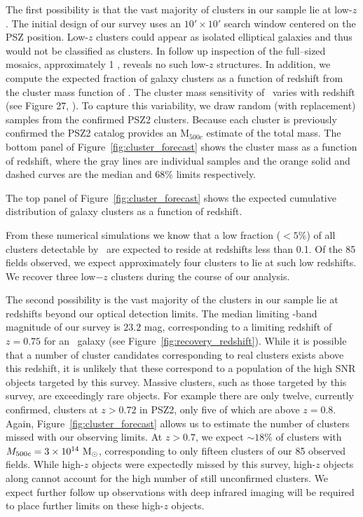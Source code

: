 \documentclass[apj, revtex4-1]{emulateapj}
\begin{document}
The first possibility is that the vast majority of clusters in our sample lie at low-$z$. The initial design of our survey uses an $10'\times10'$ search window centered on the PSZ position. Low-$z$ clusters could appear as isolated elliptical galaxies and thus would not be classified as clusters. In follow up inspection of the full--sized mosaics, approximately 1 \degsq, reveals no such low-$z$ structures. In addition, we compute the expected fraction of galaxy clusters as a function of redshift from the cluster mass function of \cite{Tinker2008}. The cluster mass sensitivity of \planck\ varies with redshift (see Figure 27, \citealt{PlanckCollaboration2015a}). To capture this variability, we draw random (with replacement) samples from the confirmed PSZ2 clusters. Because each cluster is previously confirmed the PSZ2 catalog provides an M$_{500c}$ estimate of the total mass. The bottom panel of Figure~\ref{fig:cluster_forecast} shows the cluster mass as a function of redshift, where the gray lines are individual samples and the orange solid and dashed curves are the median and 68\% limits respectively.

The top panel of Figure~\ref{fig:cluster_forecast} shows the expected cumulative distribution of galaxy clusters as a function of redshift.

From these numerical simulations we know that a low fraction ($<5\%$) of all clusters detectable by \planck\ are expected to reside at redshifts less than 0.1. Of the 85 fields observed, we expect approximately four clusters to lie at such low redshifts. We recover three low$-z$ clusters during the course of our analysis.

The second possibility is the vast majority of the clusters in our sample lie at redshifts beyond our optical detection limits. The median limiting \sdssi-band magnitude of our survey is $23.2$ mag, corresponding to a limiting redshift of $z=0.75$ for an \mstar\ galaxy (see Figure~\ref{fig:recovery_redshift}). While it is possible that a number of cluster candidates corresponding to real clusters exists above this redshift, it is unlikely that these correspond to a population of the high SNR objects targeted by this survey. Massive clusters, such as those targeted by this survey, are exceedingly rare objects. For example there are only twelve, currently confirmed, clusters at $z>0.72$ in PSZ2, only five of which are above $z=0.8$. Again, Figure~\ref{fig:cluster_forecast} allows us to estimate the number of clusters missed with our observing limits. At $z>0.7$, we expect $\sim18\%$ of clusters with $M_{500c}=3\times10^{14}~\hbox{$\mathrm{M}_\odot$}$, corresponding to only fifteen clusters of our 85 observed fields. While high-$z$ objects were expectedly missed by this survey, high-$z$ objects along cannot account for the high number of still unconfirmed clusters. We expect further follow up observations with deep infrared imaging will be required to place further limits on these high-$z$ objects.
\end{document}

